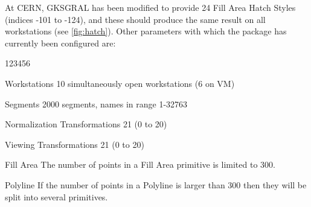 At CERN, GKSGRAL has been modified to provide 24 Fill Area Hatch Styles
(indices -101 to -124), and these should produce the same result on all
workstations (see \ref{fig:hatch}).
Other parameters with which the package has currently been configured are:
\begin{DLtt}{123456}
\item[Workstations]10 simultaneously open workstations (6 on VM)
\item[Segments]2000 segments, names in range 1-32763
\item[Normalization Transformations]21 (0 to 20)
\item[Viewing Transformations]21 (0 to 20)
\item[Fill Area]The number of points in a Fill Area primitive
is limited to 300.
\item[Polyline]If the number of points in a Polyline is larger
than 300 then they will be split into several primitives.
\end{DLtt}
 
